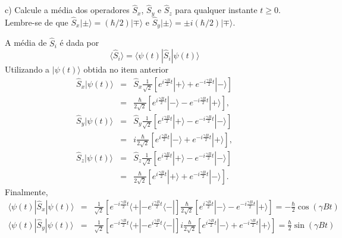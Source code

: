 \begin{enumerate}[start=1,label={\bfseries Q\arabic*.}]
c) Calcule a média dos operadores $\hat{S}_{x}$, $\hat{S}_{y}$ e $\hat{S}_{z}$ para qualquer instante $t \geq 0$. Lembre-se de que $\hat{S}_{x} |\pm \rangle = (\hbar/2) |\mp \rangle $ e $\hat{S}_{y} |\pm \rangle = \pm i (\hbar/2) |\mp \rangle $.

\resposta A média de $\hat{S}_{i}$ é dada por
%
\begin{equation}
  \langle \hat{S}_{i} \rangle = \langle \psi (t) |  \hat{S}_{i} | \psi (t)  \rangle
\end{equation}
%
Utilizando a $|\psi (t) \rangle$ obtida no item anterior
%
\begin{equation}
\begin{array}{ccc}
  \hat{S}_{x} | \psi (t) \rangle &=& \hat{S}_{x} \frac{1}{\sqrt{2}} \left[ e^{i \frac{\gamma B}{2} t} | + \rangle + e^{-i \frac{\gamma B}{2} t} | - \rangle  \right] \\
    & = & \frac{\hbar}{2\sqrt{2}} \left[ e^{i \frac{\gamma B}{2} t} | - \rangle - e^{-i \frac{\gamma B}{2} t} | + \rangle  \right] , \\
  \hat{S}_{y} | \psi (t) \rangle &=& \hat{S}_{y} \frac{1}{\sqrt{2}} \left[ e^{i \frac{\gamma B}{2} t} | + \rangle - e^{-i \frac{\gamma B}{2} t} | - \rangle  \right] \\
    & = & i \frac{\hbar}{2\sqrt{2}} \left[ e^{i \frac{\gamma B}{2} t} | - \rangle + e^{-i \frac{\gamma B}{2} t} | + \rangle  \right] , \\
  \hat{S}_{z} | \psi (t) \rangle &=& \hat{S}_{z} \frac{1}{\sqrt{2}} \left[ e^{i \frac{\gamma B}{2} t} | + \rangle - e^{-i \frac{\gamma B}{2} t} | - \rangle  \right] \\
    & = & \frac{\hbar}{2\sqrt{2}} \left[ e^{i \frac{\gamma B}{2} t} | + \rangle + e^{-i \frac{\gamma B}{2} t} | - \rangle  \right] .
\end{array}
\end{equation}
%
Finalmente,
%
\begin{equation}
\begin{array}{ccc}
   \langle \psi(t) | \hat{S}_{x} | \psi (t) \rangle &=& \frac{1}{\sqrt{2}} \left[ e^{-i \frac{\gamma B}{2} t} \langle + | - e^{i \frac{\gamma B}{2} t} \langle - |  \right]  \frac{\hbar}{2\sqrt{2}} \left[ e^{i \frac{\gamma B}{2} t} | - \rangle - e^{-i \frac{\gamma B}{2} t} | + \rangle  \right] =  - \frac{\hbar}{2} \cos (\gamma B t) \\
   \langle \psi(t) | \hat{S}_{y} | \psi (t) \rangle &=& \frac{1}{\sqrt{2}} \left[ e^{-i \frac{\gamma B}{2} t} \langle + | - e^{i \frac{\gamma B}{2} t} \langle - |  \right] i \frac{\hbar}{2\sqrt{2}} \left[ e^{i \frac{\gamma B}{2} t} | - \rangle + e^{-i \frac{\gamma B}{2} t} | + \rangle  \right] =  \frac{\hbar}{2} \sin (\gamma B t) \\

\end{array}
\end{equation}
\end{enumerate}
